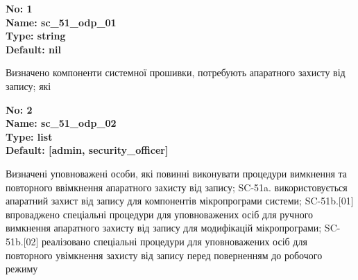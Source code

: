 \documentclass{article}
\begin{document}
\vspace{10pt}
{\footnotesize\bfseries
No: 1\\
Name: sc\_\allowbreak{}51\_\allowbreak{}odp\_\allowbreak{}01\\
Type: string\\
Default: nil
}

{\footnotesize Визначено компоненти системної прошивки, потребують апаратного захисту від запису; які}


{\footnotesize\bfseries
No: 2\\
Name: sc\_\allowbreak{}51\_\allowbreak{}odp\_\allowbreak{}02\\
Type: list\\
Default: [\textquotedbl{}admin\textquotedbl{}, \textquotedbl{}security\_\allowbreak{}officer\textquotedbl{}]
}

{\footnotesize Визначені уповноважені особи, які повинні виконувати процедури вимкнення та повторного ввімкнення апаратного захисту від запису; SC-51a. використовується апаратний захист від запису для компонентів мікропрограми системи; SC-51b.[01] впроваджено спеціальні процедури для уповноважених осіб для ручного вимкнення апаратного захисту від запису для модифікацій мікропрограми; SC-51b.[02] реалізовано спеціальні процедури для уповноважених осіб для повторного увімкнення захисту від запису перед поверненням до робочого режиму}
\end{document}

